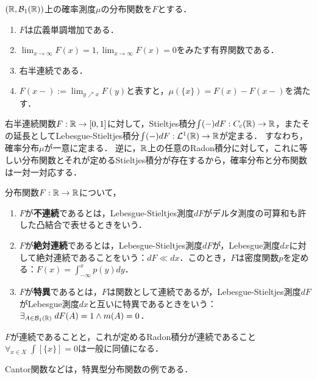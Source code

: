 \documentclass[uplatex,dvipdfmx]{jsreport}
\begin{document}
\begin{lemma}
    $(\mathbb{R},\mathcal{B}_1(\mathbb{R}))$上の確率測度$\mu$の分布関数を$F$とする．
    \begin{enumerate}
        \item $F$は広義単調増加である．
        \item $\lim_{x\to\infty}F(x)=1,\lim_{x\to\infty}F(x)=0$をみたす有界関数である．
        \item 右半連続である．
        \item $F(x-):=\lim_{y\nearrow x}F(y)$と表すと，$\mu(\{x\})=F(x)-F(x-)$を満たす．
    \end{enumerate}
\end{lemma}
\begin{remarks}
    右半連続関数$F:\mathbb{R}\to[0,1]$に対して，Stieltjes積分$\int(-)dF:C_c(\mathbb{R})\to\mathbb{R}$，またその延長としてLebesgue-Stieltjes積分$\int(-)dF:\mathcal{L}^1(\mathbb{R})\to\mathbb{R}$が定まる．
    すなわち，確率分布$\mu$が一意に定まる．
    逆に，$\mathbb{R}$上の任意のRadon積分に対して，これに等しい分布関数とそれが定めるStieltjes積分が存在するから，確率分布と分布関数は一対一対応する．
\end{remarks}

\begin{definition}
    分布関数$F:\mathbb{R}\to\mathbb{R}$について，
    \begin{enumerate}
        \item $F$が\textbf{不連続}であるとは，Lebesgue-Stieltjes測度$dF$がデルタ測度の可算和も許した凸結合で表せるときをいう．
        \item $F$が\textbf{絶対連続}であるとは，Lebesgue-Stieltjes測度$dF$が，Lebesgue測度$dx$に対して絶対連続であることをいう：$dF\ll dx$．このとき，$F$は密度関数$p$を定める：$F(x)=\int_{-\infty}^xp(y)dy$．
        \item $F$が\textbf{特異}であるとは，$F$は関数として連続であるが，Lebesgue-Stieltjes測度$dF$がLebesgue測度$dx$と互いに特異であるときをいう：$\exists_{A\in\mathcal{B}_1(\mathbb{R})}\;dF(A)=1\land m(A)=0$．
    \end{enumerate}
\end{definition}
\begin{remark}
    $F$が連続であることと，これが定めるRadon積分が連続であること$\forall_{x\in X}\;\int[\{x\}]=0$は一般に同値になる．
\end{remark}

\begin{example}
    Cantor関数などは，特異型分布関数の例である．
\end{example}
\end{document}
